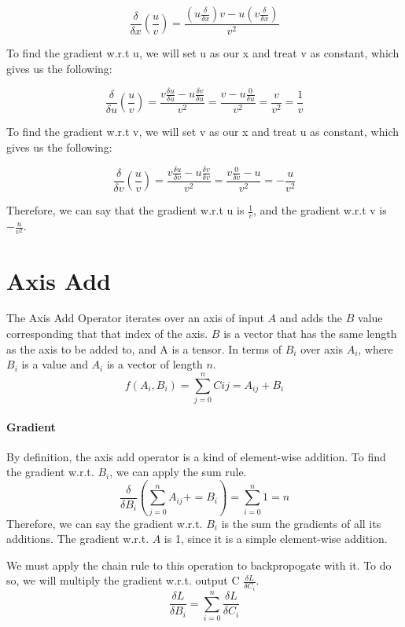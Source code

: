 \documentclass{report}
\begin{document}
            $$\frac{\delta}{\delta{x}}(\frac{u}{v}) = \frac{(u\frac{\delta}{\delta{x}})v - u(v\frac{\delta}{\delta{x}})}{v^2}$$
    
            To find the gradient w.r.t u, we will set u as our x and treat v as constant, which gives us the following:
    
            $$\frac{\delta}{\delta{u}}(\frac{u}{v}) = \frac{v\frac{\delta{u}}{\delta{u}} - u\frac{\delta{v}}{\delta{u}}}{v^2} 
            = \frac{v - u\frac{0}{\delta{u}}}{v^2} = \frac{v}{v^2} = \frac{1}{v}$$
    
            To find the gradient w.r.t v, we will set v as our x and treat u as constant, which gives us the following:
    
            $$\frac{\delta}{\delta{v}}(\frac{u}{v}) = \frac{v\frac{\delta{u}}{\delta{v}} - u\frac{\delta{v}}{\delta{v}}}{v^2} 
            = \frac{v\frac{0}{\delta{v}} - u}{v^2} = -\frac{u}{v^2}$$
    
            Therefore, we can say that the gradient w.r.t u is $\frac{1}{v}$, and the gradient w.r.t v is $-\frac{u}{v^2}$.

        \section{Axis Add}
            The Axis Add Operator iterates over an axis of input $A$ and adds the $B$ value corresponding that that index of the axis.
            $B$ is a vector that has the same length as the axis to be added to, and A is a tensor.
            In terms of $B_i$ over axis $A_i$, where $B_i$ is a value and $A_i$ is a vector of length $n$. 
            $$f(A_i, B_i) = \sum_{j=0}^{n} C{ij} = A_{ij} + B_i$$
            
            \paragraph{Gradient}
            By definition, the axis add operator is a kind of element-wise addition. To find the gradient w.r.t. $B_i$, we can apply the sum rule.
            $$\frac{\delta}{\delta{B_i}}(\sum_{j=0}^{n} A_{ij} += B_i) = \sum_{i=0}^{n} 1 = n$$
            Therefore, we can say the gradient w.r.t. $B_i$ is the sum the gradients of all its additions. 
            The gradient w.r.t. $A$ is 1, since it is a simple element-wise addition. 

            We must apply the chain rule to this operation to backpropogate with it. To do so, 
            we will multiply the gradient w.r.t. output C $\frac{\delta{L}}{\delta{C_i}}$. 
            $$\frac{\delta{L}}{\delta{B_i}} = \sum_{i=0}^{n} \frac{\delta{L}}{\delta{C_i}}$$
\end{document}
